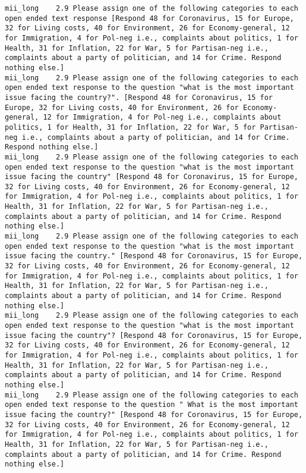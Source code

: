 \begin{lstlisting}[label=lst:promptvariants]
mii_long	2.9	Please assign one of the following categories to each open ended text response [Respond 48 for Coronavirus, 15 for Europe, 32 for Living costs, 40 for Environment, 26 for Economy-general, 12 for Immigration, 4 for Pol-neg i.e., complaints about politics, 1 for Health, 31 for Inflation, 22 for War, 5 for Partisan-neg i.e., complaints about a party of politician, and 14 for Crime. Respond nothing else.]
mii_long	2.9	Please assign one of the following categories to each open ended text response to the question "what is the most important issue facing the country?". [Respond 48 for Coronavirus, 15 for Europe, 32 for Living costs, 40 for Environment, 26 for Economy-general, 12 for Immigration, 4 for Pol-neg i.e., complaints about politics, 1 for Health, 31 for Inflation, 22 for War, 5 for Partisan-neg i.e., complaints about a party of politician, and 14 for Crime. Respond nothing else.]
mii_long	2.9	Please assign one of the following categories to each open ended text response to the question "what is the most important issue facing the country" [Respond 48 for Coronavirus, 15 for Europe, 32 for Living costs, 40 for Environment, 26 for Economy-general, 12 for Immigration, 4 for Pol-neg i.e., complaints about politics, 1 for Health, 31 for Inflation, 22 for War, 5 for Partisan-neg i.e., complaints about a party of politician, and 14 for Crime. Respond nothing else.]
mii_long	2.9	Please assign one of the following categories to each open ended text response to the question "what is the most important issue facing the country." [Respond 48 for Coronavirus, 15 for Europe, 32 for Living costs, 40 for Environment, 26 for Economy-general, 12 for Immigration, 4 for Pol-neg i.e., complaints about politics, 1 for Health, 31 for Inflation, 22 for War, 5 for Partisan-neg i.e., complaints about a party of politician, and 14 for Crime. Respond nothing else.]
mii_long	2.9	Please assign one of the following categories to each open ended text response to the question "what is the most important issue facing the country"? [Respond 48 for Coronavirus, 15 for Europe, 32 for Living costs, 40 for Environment, 26 for Economy-general, 12 for Immigration, 4 for Pol-neg i.e., complaints about politics, 1 for Health, 31 for Inflation, 22 for War, 5 for Partisan-neg i.e., complaints about a party of politician, and 14 for Crime. Respond nothing else.]
mii_long	2.9	Please assign one of the following categories to each open ended text response to the question " What is the most important issue facing the country?" [Respond 48 for Coronavirus, 15 for Europe, 32 for Living costs, 40 for Environment, 26 for Economy-general, 12 for Immigration, 4 for Pol-neg i.e., complaints about politics, 1 for Health, 31 for Inflation, 22 for War, 5 for Partisan-neg i.e., complaints about a party of politician, and 14 for Crime. Respond nothing else.]

\end{lstlisting}
